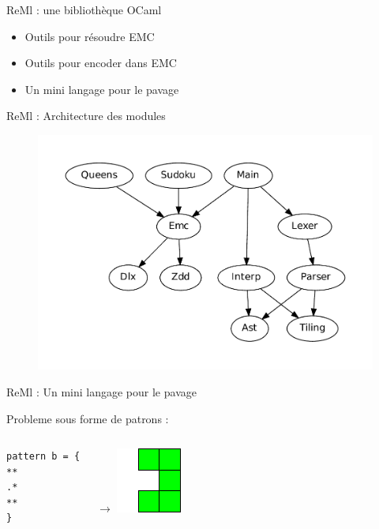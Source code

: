 \documentclass{beamer}
\begin{document}
\begin{frame}{ReMl : une bibliothèque OCaml}
\begin{itemize}
\item Outils pour résoudre EMC
\item Outils pour encoder dans EMC
\item Un mini langage pour le pavage
\end{itemize}
\end{frame}


\begin{frame}{ReMl : Architecture des modules}
\begin{figure}[htp]
\begin{center}
\includegraphics[scale=0.5]{../imports/archi.pdf}
\end{center}
\end{figure}
\end{frame}

\begin{frame}[fragile]{ReMl : Un mini langage pour le pavage}

Probleme sous forme de patrons : 
\begin{columns}
\begin{lstlisting}
pattern b = {
**
.*
**
}
\end{lstlisting}
		$\rightarrow$
\includegraphics[scale=1]{../imports/patron.pdf}
\end{columns}
\end{frame}
\end{document}

